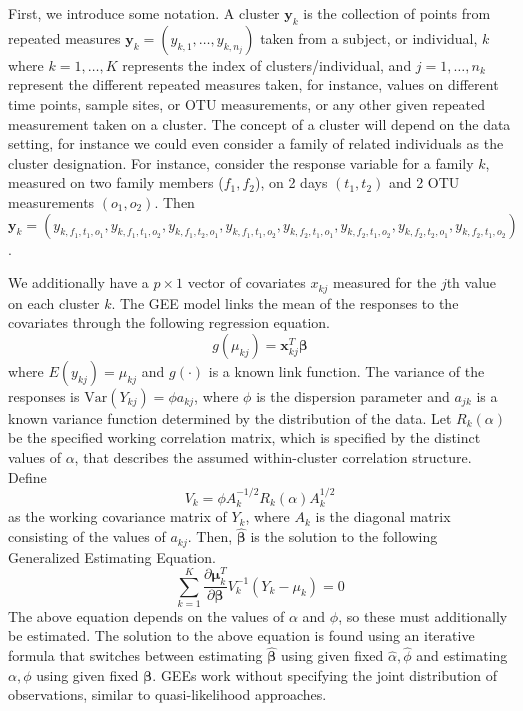 \documentclass[12pt]{article}
\begin{document}
First, we introduce some notation. A cluster $\mathbf{y}_k$ is the collection of points from repeated measures $\mathbf{y}_k = (y_{k,1}, \ldots , y_{k,n_j})$ taken from a subject, or individual, $k$ where $k = 1, \ldots , K$ represents the index of clusters/individual, and $j = 1, \ldots , n_k$ represent the different repeated measures taken, for instance, values on different  time points, sample sites, or OTU measurements, or any other given repeated measurement taken on a cluster.
The concept of a cluster will depend on the data setting, for instance we could even consider a family of related individuals as the cluster designation. For instance, consider the response variable for a family $k$, measured on two family members ($f_1,f_2$), on 2 days $(t_1,t_2)$ and 2 OTU measurements $(o_1,o_2)$. Then $\mathbf{y}_k = (y_{k, f_1,t_1,o_1}, y_{k, f_1,t_1,o_2}, y_{k, f_1,t_2,o_1}, y_{k, f_1,t_1,o_2},y_{k, f_2,t_1,o_1}, y_{k, f_2,t_1,o_2}, y_{k, f_2,t_2,o_1}, y_{k, f_2,t_1,o_2})$.

We additionally have a $p \times 1$ vector of covariates $x_{kj}$ measured for the $j$th value on each cluster $k$. The GEE model links the mean of the responses to the covariates through the following regression equation.
$$g(\mu_{kj}) = \mathbf{x}_{kj}^T\boldsymbol \beta$$
where $E(y_{kj}) = \mu_{kj}$ and $g(\cdot)$ is a known link function. The variance of the responses is $\text{Var}(Y_{kj}) = \phi a_{kj}$, where $\phi$ is the dispersion parameter and $a_{jk}$ is a known variance function determined by the distribution of the data. Let $R_k(\alpha)$ be the specified working correlation matrix, which is specified by the distinct values of $\alpha$, that describes the assumed within-cluster correlation structure. Define
$$V_k = \phi A_k^{-1/2} R_{k}(\alpha)A_k^{1/2}$$ as the working covariance matrix of $Y_k$, where $A_k$ is the diagonal matrix consisting of the values of $a_{kj}$. Then, $\hat{\boldsymbol\beta}$ is the solution to the following Generalized Estimating Equation.
$$\sum_{k=1}^K \frac{\partial  \boldsymbol\mu_k^T }{\partial \boldsymbol\beta } V_{k}^{-1} (Y_k - \mu_k) = 0 $$
The above equation depends on the values of $\alpha$ and $\phi$, so these must additionally be estimated. The solution to the above equation is found using an iterative formula that switches between estimating $\hat{\boldsymbol\beta}$ using given fixed $\hat \alpha, \hat \phi$ and estimating $\alpha,  \phi$ using given fixed $\boldsymbol\beta$. GEEs work without specifying the joint distribution of observations, similar to quasi-likelihood approaches.
\end{document}
